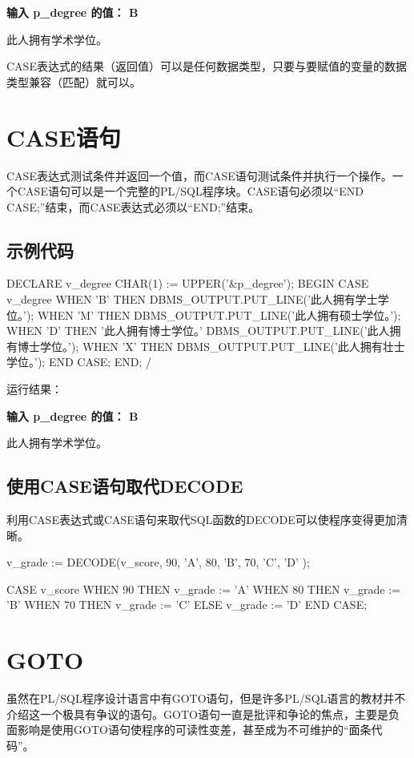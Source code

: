 \documentclass[11pt, a4paper, oneside, UTF8]{ctexbook}
\let\kaishu\relax %
\begin{document}
{\bfseries\kaishu 输入 p\_degree 的值： B

此人拥有学术学位。}

CASE表达式的结果（返回值）可以是任何数据类型，只要与要赋值的变量的数据类型兼容（匹配）就可以。

\section{CASE语句}
CASE表达式测试条件并返回一个值，而CASE语句测试条件并执行一个操作。一个CASE语句可以是一个完整的PL/SQL程序块。CASE语句必须以“END CASE;”结束，而CASE表达式必须以“END;”结束。
\subsection{示例代码}
\begin{plsql}
DECLARE
  v_degree CHAR(1) := UPPER('&p_degree');
BEGIN
  CASE v_degree
    WHEN 'B' THEN 
      DBMS_OUTPUT.PUT_LINE('此人拥有学士学位。');
    WHEN 'M' THEN 
      DBMS_OUTPUT.PUT_LINE('此人拥有硕士学位。');
    WHEN 'D' THEN '此人拥有博士学位。'
      DBMS_OUTPUT.PUT_LINE('此人拥有博士学位。');
    WHEN 'X' THEN
      DBMS_OUTPUT.PUT_LINE('此人拥有壮士学位。');
  END CASE;
END;
/
\end{plsql}
运行结果：

{\bfseries\kaishu 输入 p\_degree 的值： B

此人拥有学术学位。}

\subsection{使用CASE语句取代DECODE}
利用CASE表达式或CASE语句来取代SQL函数的DECODE可以使程序变得更加清晰。
\begin{plsql}[caption=DECODE函数]
v_grade := DECODE(v_score,
  90, 'A',
  80, 'B',
  70, 'C',
  'D'
);
\end{plsql}
\begin{plsql}[caption=CASE表达式]
CASE v_score
  WHEN 90 THEN v_grade := 'A'
  WHEN 80 THEN v_grade := 'B'
  WHEN 70 THEN v_grade := 'C'
  ELSE v_grade := 'D'
END CASE;
\end{plsql}

\section{GOTO}
虽然在PL/SQL程序设计语言中有GOTO语句，但是许多PL/SQL语言的教材并不介绍这一个极具有争议的语句。GOTO语句一直是批评和争论的焦点，主要是负面影响是使用GOTO语句使程序的可读性变差，甚至成为不可维护的“面条代码”。
\end{document}
